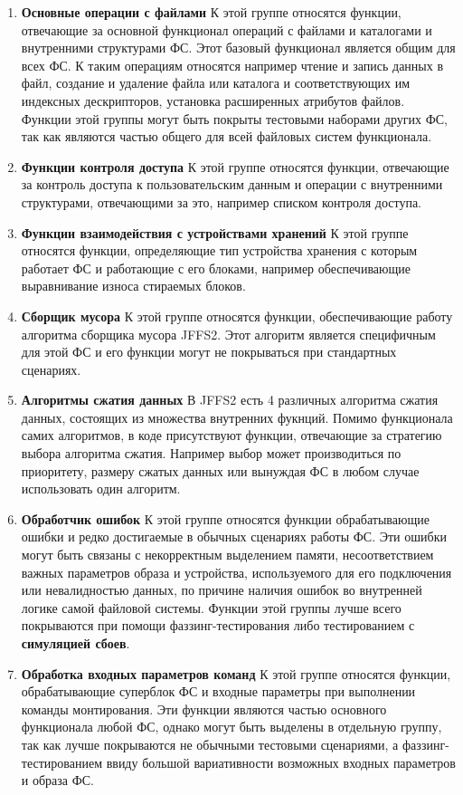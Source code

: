 \begin{enumerate}
	\item \textbf{Основные операции с файлами}
	К этой группе относятся функции, отвечающие за основной функционал операций с файлами и каталогами и внутренними структурами  ФС. Этот базовый функционал является общим для всех ФС. К таким операциям относятся например чтение и запись данных в файл, создание и удаление файла или каталога и соответствующих им индексных дескрипторов, установка расширенных атрибутов файлов. Функции этой группы могут быть покрыты тестовыми наборами других ФС, так как являются частью общего для всей файловых систем функционала.
	\item \textbf{Функции контроля доступа}
	К этой группе относятся функции, отвечающие за контроль доступа к пользовательским данным и операции с внутренними структурами, отвечающими за это, например списком контроля доступа.
	\item \textbf{Функции взаимодействия с устройствами хранений}
	К этой группе относятся функции, определяющие тип устройства хранения с которым работает ФС и работающие с его блоками, например обеспечивающие выравнивание износа стираемых блоков.
	\item \textbf{Сборщик мусора}
	К этой группе относятся функции, обеспечивающие работу алгоритма сборщика мусора JFFS2. Этот алгоритм является специфичным для этой ФС и его функции могут не покрываться при стандартных сценариях.
	\item \textbf{Алгоритмы сжатия данных}
	В JFFS2 есть 4 различных алгоритма сжатия данных, состоящих из множества внутренних фукнций. Помимо функционала самих алгоритмов, в коде присутствуют функции, отвечающие за стратегию выбора алгоритма сжатия. Например выбор может производиться по приоритету, размеру сжатых данных или вынуждая ФС в любом случае использовать один алгоритм.
	\item \textbf{Обработчик ошибок}
	К этой группе относятся функции обрабатывающие ошибки и редко достигаемые в обычных сценариях работы ФС. Эти ошибки могут быть связаны с некорректным выделением памяти, несоответствием важных параметров образа и устройства, используемого для его подключения или невалидностью данных, по причине наличия ошибок во внутренней логике самой файловой системы. Функции этой группы лучше всего покрываются при помощи фаззинг-тестирования либо тестированием с \textbf{симуляцией сбоев}.
	\item \textbf{Обработка входных параметров команд}
	К этой группе относятся функции, обрабатывающие суперблок ФС и входные параметры при выполнении команды монтирования. Эти функции являются частью основного функционала любой ФС, однако могут быть выделены в отдельную группу, так как лучше покрываются не обычными тестовыми сценариями, а фаззинг-тестированием ввиду большой вариативности возможных входных параметров и образа ФС.

\end{enumerate}

